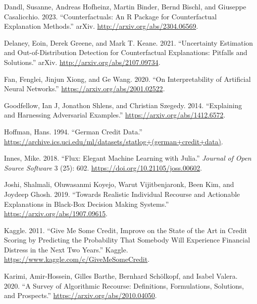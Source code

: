 \documentclass{juliacon}
\newlength{\cslhangindent}
\newlength{\cslentryspacingunit} %
\newenvironment{CSLReferences}[2] %
 {%
  \setlength{\parindent}{0pt}
  \ifodd #1
  \let\oldpar\par
  \def\par{\hangindent=\cslhangindent\oldpar}
  \fi
  \setlength{\parskip}{#2\cslentryspacingunit}
 }%
 {}
\begin{document}
\begin{CSLReferences}{1}{0}
\leavevmode{}%
Dandl, Susanne, Andreas Hofheinz, Martin Binder, Bernd Bischl, and
Giuseppe Casalicchio. 2023. {``Counterfactuals: {An} {R} {Package} for
{Counterfactual} {Explanation} {Methods}.''} arXiv.
\url{http://arxiv.org/abs/2304.06569}.

\leavevmode{}%
Delaney, Eoin, Derek Greene, and Mark T. Keane. 2021. {``Uncertainty
{Estimation} and {Out}-of-{Distribution} {Detection} for
{Counterfactual} {Explanations}: {Pitfalls} and {Solutions}.''} arXiv.
\url{http://arxiv.org/abs/2107.09734}.

\leavevmode{}%
Fan, Fenglei, Jinjun Xiong, and Ge Wang. 2020. {``On Interpretability of
Artificial Neural Networks.''} \url{https://arxiv.org/abs/2001.02522}.

\leavevmode{}%
Goodfellow, Ian J, Jonathon Shlens, and Christian Szegedy. 2014.
{``Explaining and Harnessing Adversarial Examples.''}
\url{https://arxiv.org/abs/1412.6572}.

\leavevmode{}%
Hoffman, Hans. 1994. {``German {Credit Data}.''}
\url{https://archive.ics.uci.edu/ml/datasets/statlog+(german+credit+data)}.

\leavevmode{}%
Innes, Mike. 2018. {``Flux: {Elegant} Machine Learning with {Julia}.''}
\emph{Journal of Open Source Software} 3 (25): 602.
\url{https://doi.org/10.21105/joss.00602}.

\leavevmode{}%
Joshi, Shalmali, Oluwasanmi Koyejo, Warut Vijitbenjaronk, Been Kim, and
Joydeep Ghosh. 2019. {``Towards Realistic Individual Recourse and
Actionable Explanations in Black-Box Decision Making Systems.''}
\url{https://arxiv.org/abs/1907.09615}.

\leavevmode{}%
Kaggle. 2011. {``Give Me Some Credit, {Improve} on the State of the Art
in Credit Scoring by Predicting the Probability That Somebody Will
Experience Financial Distress in the Next Two Years.''} {Kaggle}.
\url{https://www.kaggle.com/c/GiveMeSomeCredit}.

\leavevmode{}%
Karimi, Amir-Hossein, Gilles Barthe, Bernhard Schölkopf, and Isabel
Valera. 2020. {``A Survey of Algorithmic Recourse: Definitions,
Formulations, Solutions, and Prospects.''}
\url{https://arxiv.org/abs/2010.04050}.


\end{CSLReferences}
\end{document}
